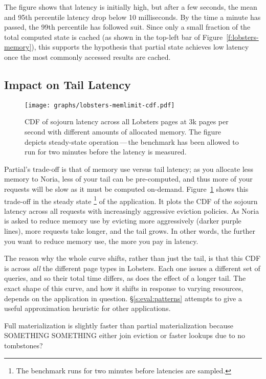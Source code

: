 The figure shows that latency is initially high, but after a few seconds, the
mean and 95th percentile latency drop below 10 milliseconds. By the time a
minute has passed, the 99th percentile has followed suit. Since only a small
fraction of the total computed state is cached (as shown in the top-left bar of
Figure~\ref{f:lobsters-memory}), this supports the hypothesis that partial state 
achieves low latency once the most commonly accessed results are cached.

\subsection{Impact on Tail Latency}

\begin{figure}[h]
  \centering
  \texttt{[image: graphs/lobsters-memlimit-cdf.pdf]}
  \caption{CDF of sojourn latency across all Lobsters pages at 3k pages per
  second with different amounts of allocated memory. The figure depicts
  steady-state operation\,---\,the benchmark has been allowed to run for two
  minutes before the latency is measured.}
  \label{f:lobsters-mem-latency}
\end{figure}

Partial's trade-off is that of memory use versus tail latency; as you allocate
less memory to Noria, less of your tail can be pre-computed, and thus more of
your requests will be slow as it must be computed on-demand.
Figure~\ref{f:lobsters-mem-latency} shows this trade-off in the steady state%
\footnote{The benchmark runs for two minutes before latencies are sampled.}
of the application. It plots the CDF of the sojourn latency across all requests
with increasingly aggressive eviction policies. As Noria is asked to
reduce memory use by evicting more aggressively (darker purple lines), more
requests take longer, and the tail grows. In other words, the further you want
to reduce memory use, the more you pay in latency.

The reason why the whole curve shifts, rather than just the tail, is that this
CDF is across \emph{all} the different page types in Lobsters. Each one issues a
different set of queries, and so their total time differs, as does the effect of
a longer tail. The exact shape of this curve, and how it shifts in response to
varying resources, depends on the application in question.
\S\ref{s:eval:patterns} attempts to give a useful approximation heuristic for
other applications.

\begin{inprogress}
Full materialization is slightly faster than partial materialization because
SOMETHING SOMETHING either join eviction or faster lookups due to no tombstones?
\end{inprogress}


